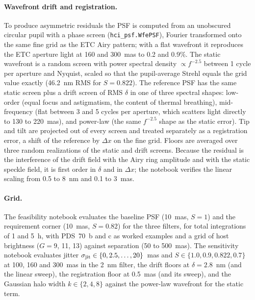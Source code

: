 \documentclass[11pt]{article}
\begin{document}
\paragraph{Wavefront drift and registration.} To produce asymmetric residuals the PSF is computed from an unobscured circular pupil with a phase screen (\texttt{hci\_psf.WfePSF}), Fourier transformed onto the same fine grid as the ETC Airy pattern; with a flat wavefront it reproduces the ETC aperture light at 160 and 300~mas to 0.2 and 0.9\%. The static wavefront is a random screen with power spectral density $\propto f^{-2.5}$ between 1 cycle per aperture and Nyquist, scaled so that the pupil-average Strehl equals the grid value exactly (46.2~nm RMS for $S = 0.822$). The reference PSF has the same static screen plus a drift screen of RMS $\delta$ in one of three spectral shapes: low-order (equal focus and astigmatism, the content of thermal breathing), mid-frequency (flat between 3 and 5 cycles per aperture, which scatters light directly to 130 to 220~mas), and power-law (the same $f^{-2.5}$ shape as the static error). Tip and tilt are projected out of every screen and treated separately as a registration error, a shift of the reference by $\Delta x$ on the fine grid. Floors are averaged over three random realizations of the static and drift screens. Because the residual is the interference of the drift field with the Airy ring amplitude and with the static speckle field, it is first order in $\delta$ and in $\Delta x$; the notebook verifies the linear scaling from 0.5 to 8~nm and 0.1 to 3~mas.

\paragraph{Grid.} The feasibility notebook evaluates the baseline PSF (10~mas, $S = 1$) and the requirement corner (10~mas, $S = 0.82$) for the three filters, for total integrations of 1 and 5~h, with PDS~70~b and c as worked examples and a grid of host brightness ($G = 9$, 11, 13) against separation (50 to 500~mas). The sensitivity notebook evaluates jitter $\sigma_{\rm jit} \in \{0, 2.5, \ldots, 20\}$~mas and $S \in \{1.0, 0.9, 0.822, 0.7\}$ at 100, 160 and 300~mas in the 2~nm filter, the drift floors at $\delta = 2.8$~nm (and the linear sweep), the registration floor at 0.5~mas (and its sweep), and the Gaussian halo width $k \in \{2, 4, 8\}$ against the power-law wavefront for the static term.

\end{document}
